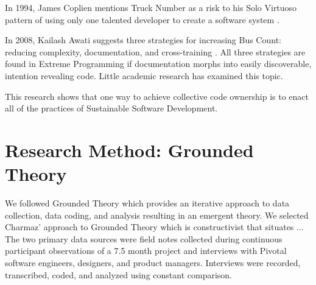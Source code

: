 In 1994, James Coplien mentions Truck Number as a risk to his Solo Virtuoso pattern of using only one talented developer to create a software system \cite{Coplien1994}. 

In 2008, Kailash Awati suggests three strategies for increasing Bus Count: reducing complexity, documentation, and cross-training \cite{AwatiBusFactor}. All three strategies are found in Extreme Programming if documentation morphs into easily discoverable, intention revealing code. Little academic research has examined this topic. 




This research shows that one way to achieve collective code ownership is to enact all of the practices of Sustainable Software Development.

\section{Research Method: Grounded Theory}
\label{ResearchMethod}

We followed Grounded Theory \cite{Charmaz} which provides an iterative approach to data collection, data coding, and analysis resulting in an emergent theory. We selected Charmaz' approach to Grounded Theory which is constructivist that situates ...
The two primary data sources were field notes collected during continuous participant observations of a 7.5 month project and interviews with Pivotal software engineers, designers, and product managers. Interviews were recorded, transcribed, coded, and analyzed using constant comparison. 

